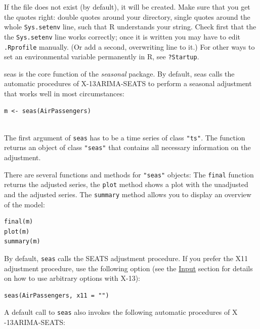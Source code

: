 If the file does not exist (by default), it will be created. Make sure
that you get the quotes right: double quotes around your directory,
single quotes around the whole \texttt{Sys.setenv} line, such that R
understands your string. Check first that the the \texttt{Sys.setenv}
line works correctly; once it is written you may have to edit
\texttt{.Rprofile} manually. (Or add a second, overwriting line to it.)
For other ways to set an environmental variable permanently in R, see
\texttt{?Startup}.


seas is the core function of the \emph{seasonal} package. By default,
seas calls the automatic procedures of X-13ARIMA-SEATS to perform a
seasonal adjustment that works well in most circumstances:

\begin{verbatim}
m <- seas(AirPassengers)
 
\end{verbatim}

The first argument of \texttt{seas} has to be a time series of class
\texttt{"ts"}. The function returns an object of class \texttt{"seas"}
that contains all necessary information on the adjustment.

There are several functions and methods for \texttt{"seas"} objects: The
\texttt{final} function returns the adjusted series, the \texttt{plot}
method shows a plot with the unadjusted and the adjusted series. The
\texttt{summary} method allows you to display an overview of the model:

\begin{verbatim}
final(m)
plot(m)
summary(m)
\end{verbatim}

By default, \texttt{seas} calls the SEATS adjustment procedure. If you
prefer the X11 adjustment procedure, use the following option (see the
\hyperref[input]{Input} section for details on how to use arbitrary
options with X-13):

\begin{verbatim}
seas(AirPassengers, x11 = "")
\end{verbatim}

A default call to \texttt{seas} also invokes the following automatic
procedures of X -13ARIMA-SEATS:

